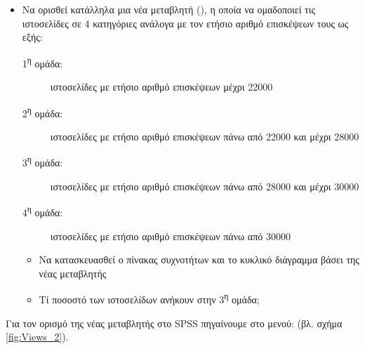 \documentclass{assignment}
\begin{document}
\begin{Assignment}[Μέρος Α]
{\begin{itemize}
  \item Να ορισθεί κατάλληλα μια νέα μεταβλητή (), η οποία να ομαδοποιεί τις ιστοσελίδες σε 4 κατηγόριες ανάλογα με τον ετήσιο αριθμό επισκέψεων τους ως εξής:
  \begin{description}
    \item [1\textsuperscript{η} ομάδα:] ιστοσελίδες με ετήσιο αριθμό επισκέψεων μέχρι 22000
    \item [2\textsuperscript{η} ομάδα:] ιστοσελίδες με ετήσιο αριθμό επισκέψεων πάνω από 22000 και μέχρι 28000
    \item [3\textsuperscript{η} ομάδα:] ιστοσελίδες με ετήσιο αριθμό επισκέψεων πάνω από 28000 και μέχρι 30000
    \item [4\textsuperscript{η} ομάδα:] ιστοσελίδες με ετήσιο αριθμό επισκέψεων πάνω από 30000 
  \end{description}
  \begin{itemize}
    \item Να κατασκευασθεί ο πίνακας συχνοτήτων και το κυκλικό διάγραμμα βάσει της νέας μεταβλητής
    \item Τί ποσοστό των ιστοσελίδων ανήκουν στην 3\textsuperscript{η} ομάδα;
  \end{itemize}
\end{itemize}

}

Για τον ορισμό της νέας μεταβλητής στο SPSS πηγαίνουμε στο μενού:  (βλ. σχήμα \ref{fig:Views_2}).


\end{Assignment}
\end{document}
